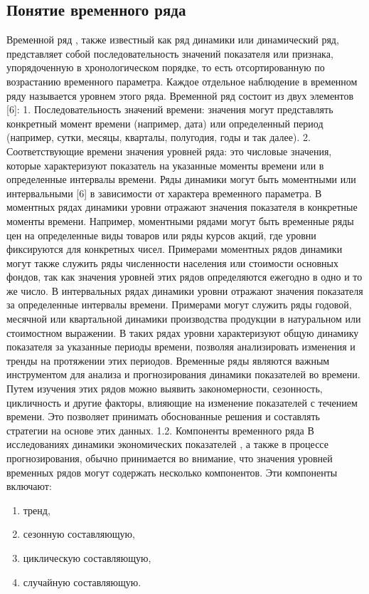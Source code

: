 \subsection{Понятие временного ряда}
Временной ряд \cite{ивин2020математический}, также известный как ряд динамики или динамический ряд, представляет собой последовательность значений показателя или признака, упорядоченную в хронологическом порядке, то есть отсортированную по возрастанию временного параметра. Каждое отдельное наблюдение в временном ряду называется уровнем этого ряда.
Временной ряд состоит из двух элементов [6]:
1. Последовательность значений времени: значения могут представлять конкретный момент времени (например, дата) или определенный период (например, сутки, месяцы, кварталы, полугодия, годы и так далее).
2. Соответствующие времени значения уровней ряда: это числовые значения, которые характеризуют показатель на указанные моменты времени или в определенные интервалы времени.
Ряды динамики могут быть моментными или интервальными [6] в зависимости от характера временного параметра. В моментных рядах динамики уровни отражают значения показателя в конкретные моменты времени. Например, моментными рядами могут быть временные ряды цен на определенные виды товаров или ряды курсов акций, где уровни фиксируются для конкретных чисел. Примерами моментных рядов динамики могут также служить ряды численности населения или стоимости основных фондов, так как значения уровней этих рядов определяются ежегодно в одно и то же число.
В интервальных рядах динамики уровни отражают значения показателя за определенные интервалы времени. Примерами могут служить ряды годовой, месячной или квартальной динамики производства продукции в натуральном или стоимостном выражении. В таких рядах уровни характеризуют общую динамику показателя за указанные периоды времени, позволяя анализировать изменения и тренды на протяжении этих периодов.
Временные ряды являются важным инструментом для анализа и прогнозирования динамики показателей во времени. Путем изучения этих рядов можно выявить закономерности, сезонность, цикличность и другие факторы, влияющие на изменение показателей с течением времени. Это позволяет принимать обоснованные решения и составлять стратегии на основе этих данных.
1.2. Компоненты временного ряда
В исследованиях динамики экономических показателей \cite{ивин2020математический}, а также в процессе прогнозирования, обычно принимается во внимание, что значения уровней временных рядов могут содержать несколько компонентов. Эти компоненты включают:

\begin{enumerate}
	\item тренд, 
	\item сезонную составляющую, 
	\item циклическую составляющую,
	\item случайную составляющую.
\end{enumerate}

